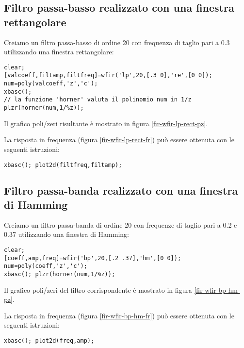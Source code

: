 \subsection*{Filtro passa-basso realizzato con una finestra rettangolare}
Creiamo un filtro passa-basso di ordine 20 con frequenza di taglio pari a 0.3 utilizzando una finestra rettangolare:
\begin{verbatim}
clear;
[valcoeff,filtamp,filtfreq]=wfir('lp',20,[.3 0],'re',[0 0]);
num=poly(valcoeff,'z','c');
xbasc();
// la funzione 'horner' valuta il polinomio num in 1/z
plzr(horner(num,1/%z));
\end{verbatim}
Il grafico poli/zeri risultante \`e mostrato in figura \ref{fir-wfir-lp-rect-pz}.


La risposta in frequenza (figura \ref{fir-wfir-lp-rect-fr}) pu\`o essere ottenuta con le seguenti istruzioni:
\begin{verbatim}
xbasc(); plot2d(filtfreq,filtamp);
\end{verbatim}


\subsection*{Filtro passa-banda realizzato con una finestra di Hamming}
Creiamo un filtro passa-banda di ordine 20 con frequenze di taglio pari a 0.2 e 0.37 utilizzando una finestra di Hamming:
\begin{verbatim}
clear;
[coeff,amp,freq]=wfir('bp',20,[.2 .37],'hm',[0 0]);
num=poly(coeff,'z','c');
xbasc(); plzr(horner(num,1/%z));
\end{verbatim}
Il grafico poli/zeri del filtro corrispondente \`e mostrato in figura \ref{fir-wfir-bp-hm-pz}.


La risposta in frequenza (figura \ref{fir-wfir-bp-hm-fr}) pu\`o essere ottenuta con le seguenti istruzioni:
\begin{verbatim}
xbasc(); plot2d(freq,amp);
\end{verbatim}


